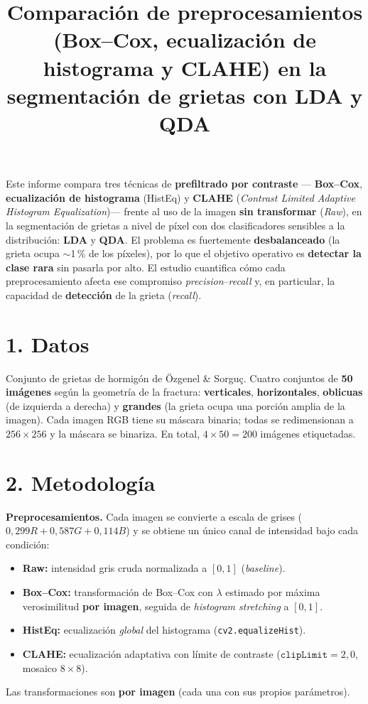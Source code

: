 \documentclass[11pt]{article}
\title{\vspace{-2.5em}Comparaci\'on de preprocesamientos (Box--Cox, ecualizaci\'on de
histograma y CLAHE) en la segmentaci\'on de grietas con LDA y QDA}
\author{}
\date{}
\begin{document}
\maketitle
\vspace{-3em}

Este informe compara tres t\'ecnicas de \textbf{prefiltrado por contraste} ---
\textbf{Box--Cox}, \textbf{ecualizaci\'on de histograma} (HistEq) y \textbf{CLAHE}
(\emph{Contrast Limited Adaptive Histogram Equalization})--- frente al uso de la
imagen \textbf{sin transformar} (\emph{Raw}), en la segmentaci\'on de grietas a nivel
de p\'ixel con dos clasificadores sensibles a la distribuci\'on: \textbf{LDA} y
\textbf{QDA}. El problema es fuertemente \textbf{desbalanceado} (la grieta ocupa
$\sim$1\,\% de los p\'ixeles), por lo que el objetivo operativo es \textbf{detectar la
clase rara} sin pasarla por alto. El estudio cuantifica c\'omo cada preprocesamiento
afecta ese compromiso \emph{precision}--\emph{recall} y, en particular, la capacidad
de \textbf{detecci\'on} de la grieta (\emph{recall}).

\section*{1. Datos}
Conjunto de grietas de hormig\'on de \"Ozgenel \& Sorgu\c{c}. Cuatro conjuntos de
\textbf{50 im\'agenes} seg\'un la geometr\'ia de la fractura: \textbf{verticales},
\textbf{horizontales}, \textbf{oblicuas} (de izquierda a derecha) y \textbf{grandes}
(la grieta ocupa una porci\'on amplia de la imagen). Cada imagen RGB tiene su
m\'ascara binaria; todas se redimensionan a $256\times256$ y la m\'ascara se
binariza. En total, $4\times50=200$ im\'agenes etiquetadas.

\section*{2. Metodolog\'ia}
\textbf{Preprocesamientos.} Cada imagen se convierte a escala de grises
($0{,}299R+0{,}587G+0{,}114B$) y se obtiene un \'unico canal de intensidad bajo cada
condici\'on:
\begin{itemize}
  \item \textbf{Raw:} intensidad gris cruda normalizada a $[0,1]$ (\emph{baseline}).
  \item \textbf{Box--Cox:} transformaci\'on de Box--Cox con $\lambda$ estimado por
  m\'axima verosimilitud \textbf{por imagen}, seguida de \emph{histogram stretching}
  a $[0,1]$.
  \item \textbf{HistEq:} ecualizaci\'on \emph{global} del histograma
  (\texttt{cv2.equalizeHist}).
  \item \textbf{CLAHE:} ecualizaci\'on adaptativa con l\'imite de contraste
  ($\mathtt{clipLimit}=2{,}0$, mosaico $8\times8$).
\end{itemize}
Las transformaciones son \textbf{por imagen} (cada una con sus propios par\'ametros).
\end{document}
